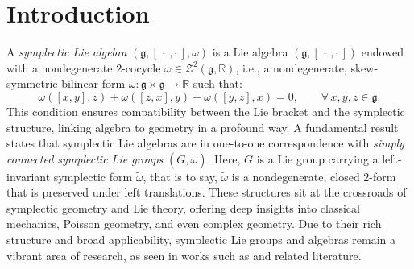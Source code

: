\documentclass[final,1p,times,nopreprintline]{elsarticle}
\theoremstyle{definition}
\numberwithin{equation}{section}
\newcommand{\rel}{\mathbb{R}}
\newcommand{\w}{\omega}
\newcommand{\g}{\mathfrak{g}}
\numberwithin{equation}{section}
\newcommand{\cro}{[\,\cdot\,,\cdot\,]}
\begin{document}
\section{Introduction}
A \textit{symplectic Lie algebra} $(\g,\cro,\omega)$ is a Lie algebra $(\g,\cro)$ endowed with a nondegenerate $2$-cocycle $\w\in\mathcal{Z}^2(\g,\rel)$, i.e., a nondegenerate, skew-symmetric bilinear form $\omega:\mathfrak{g}\times\mathfrak{g}\to{\mathbb{R}}$ such that:    
\begin{equation*}
	\w([x,y],z)+\w([z,x],y)+\w([y,z],x)=0,\qquad\forall\,x,y,z\in\g.
\end{equation*}
This condition ensures compatibility between the Lie bracket and the symplectic structure, linking algebra to geometry in a profound way. A fundamental result states that symplectic Lie algebras are in one-to-one correspondence with \textit{simply connected symplectic Lie groups} $(G, \widetilde{\omega})$. Here, $G$ is a Lie group carrying a left-invariant symplectic form $\widetilde{\omega}$, that is to say, $\widetilde{\omega}$ is a nondegenerate, closed $2$-form that is preserved under left translations. These structures sit at the crossroads of symplectic geometry and Lie theory, offering deep insights into classical mechanics, Poisson geometry, and even complex geometry. Due to their rich structure and broad applicability, symplectic Lie groups and algebras remain a vibrant area of research, as seen in works such as \cite{Bau, BeGo} and related literature.
\end{document}
